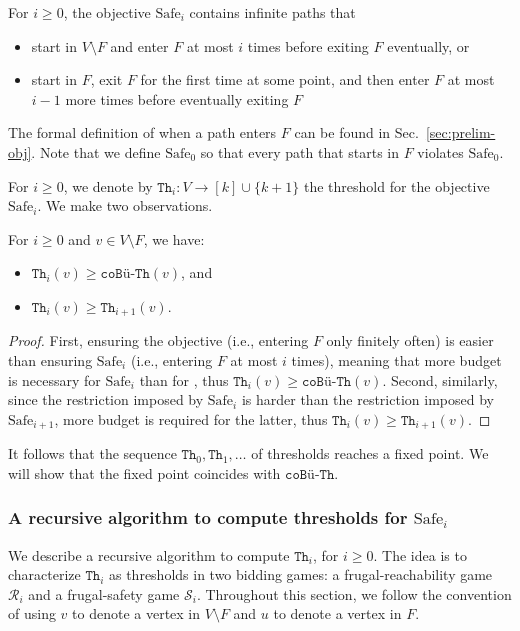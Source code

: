 \documentclass{article}\providecommand{\nequiv}{\not\equiv}\usepackage[a4paper,margin=20mm]{geometry}
\newcommand{\R}{{\mathcal R}}
\renewcommand{\S}{{\mathcal S}}
\newcommand{\notF}{V \setminus F}
\newcommand{\thresh}{\texttt{Th}\xspace}
\newcommand{\coTh}{\texttt{coB\"u-Th}}
\newcommand{\safe}{\text{Safe}}
\newcommand{\coBuchi}{\text{co-B\"uchi}\xspace}
\begin{document}
\begin{definition}
For $i \geq 0$, the objective $\safe_i$ contains infinite paths that 
\begin{itemize}
\item start in $V \setminus F$ and enter $F$ at most $i$ times before exiting \(F\) eventually, or
\item start in $F$, exit $F$ for the first time at some point, and then enter $F$ at most $i-1$ more times before eventually exiting \(F\)
\end{itemize}
\end{definition}
The formal definition of when a path enters $F$ can be found in Sec.~\ref{sec:prelim-obj}. Note that we define $\safe_0$ so that every path that starts in $F$ violates $\safe_0$.

For $i \geq 0$, we denote by $\thresh_i: V \rightarrow [k] \cup \{k+1\}$ the threshold for the objective $\safe_i$. We make two observations. 

\begin{observation}
\label{obs:Buchi}
For $i \geq 0$ and $v \in \notF$, we have:
\begin{itemize}
\item $\thresh_i(v) \geq \coTh(v)$, and  
\item $\thresh_i(v) \geq \thresh_{i+1}(v)$.
\end{itemize}
\end{observation}
\begin{proof}
First, ensuring the \coBuchi objective (i.e., entering $F$ only finitely often) is easier than ensuring $\safe_i$ (i.e., entering $F$ at most $i$ times), meaning that more budget is necessary for $\safe_i$ than for \coBuchi, thus $\thresh_i(v) \geq \coTh(v)$. Second, similarly, since the restriction imposed by $\safe_i$ is harder than the restriction imposed by $\safe_{i+1}$, more budget is required for the latter, thus $\thresh_i(v) \geq \thresh_{i+1}(v)$.
\end{proof}


It follows that the sequence $\thresh_0,\thresh_1,\ldots$ of thresholds reaches a fixed point. We will show that the fixed point coincides with $\coTh$. 





\subsubsection{A recursive algorithm to compute thresholds for $\safe_i$}
We describe a recursive algorithm to compute $\thresh_i$, for $i \geq 0$. The idea is to characterize $\thresh_i$ as thresholds in two bidding games: a frugal-reachability game $\R_i$ and a frugal-safety game $\S_i$. Throughout this section, we follow the convention of using $v$ to denote a vertex in $V \setminus F$ and $u$ to denote a vertex in $F$. 
\end{document}
